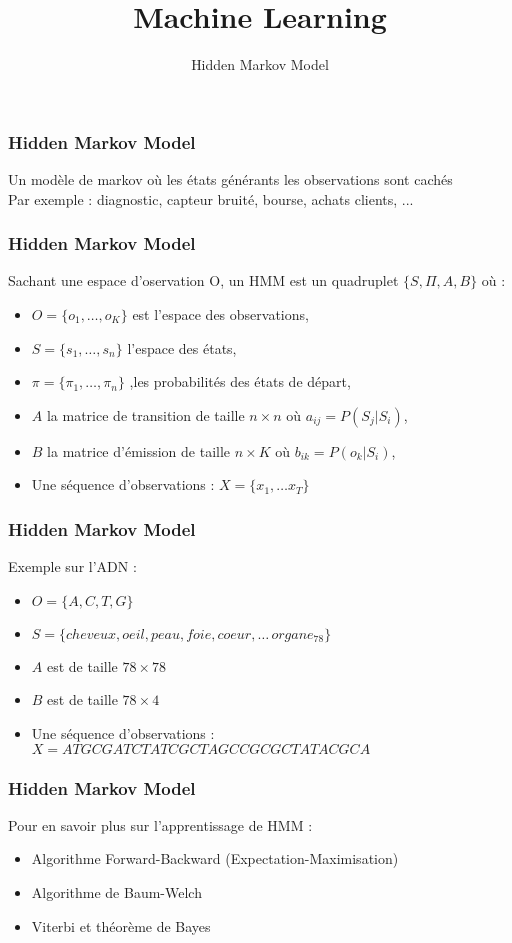\documentclass{formation}
\title{Machine Learning}
\subtitle{Hidden Markov Model}
\begin{document}
\maketitle

\begin{frame}
  \frametitle{Hidden Markov Model}
  Un modèle de markov où les états générants les observations sont cachés \\
  Par exemple : diagnostic, capteur bruité, bourse, achats clients, ...
\end{frame}

\begin{frame}
  \frametitle{Hidden Markov Model}
  Sachant une espace d'oservation O, un HMM est un quadruplet $\{S,\Pi,A,B\}$ où :
  \begin{itemize}
  \item $O = \{o_1, \dotsc, o_K \}$ est l'espace des observations,
  \item $S = \{s_1, \dotsc, s_n \}$ l'espace des états,
  \item $\pi = \{\pi_1, \dotsc, \pi_n \}$ ,les probabilités des états de départ,
  \item $A$ la matrice de transition de taille $n\times n$ où $a_{ij} = P(S_j|S_i)$,
  \item $B$ la matrice d'émission de taille $n\times K$ où $b_{ik} = P(o_k|S_i)$,
  \item Une séquence d'observations : $X=\{x_1, \dotsc x_T \}$
  \end{itemize}
\end{frame}

\begin{frame}
  \frametitle{Hidden Markov Model}
  Exemple sur l'ADN : 
  \begin{itemize}
  \item $O = \{A,C,T,G\}$ 
  \item $S =  \{cheveux, oeil, peau, foie, coeur,\dotsc\,organe_{78}\}$
  \item $A$ est de taille $78 \times 78$ 
  \item $B$ est de taille $78\times 4$
  \item Une séquence d'observations : $X=ATGCGATCTATCGCTAGCCGCGCTATACGCA$
  \end{itemize}
\end{frame}

\begin{frame}
  \frametitle{Hidden Markov Model}
  Pour en savoir plus sur l'apprentissage de HMM :
  \begin{itemize}
  \item Algorithme Forward-Backward (Expectation-Maximisation)
  \item Algorithme de Baum-Welch
  \item Viterbi et théorème de Bayes
  \end{itemize}
\end{frame}
\end{document}
